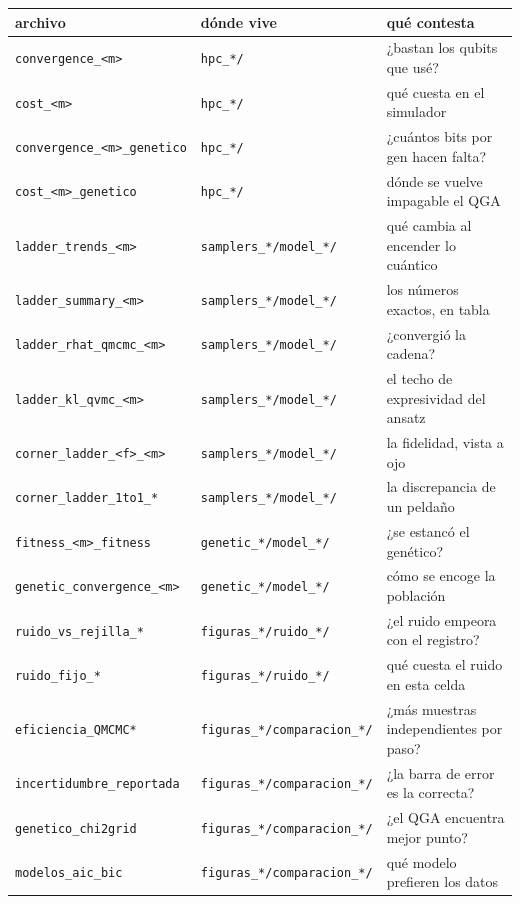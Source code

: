\documentclass[11pt,a4paper]{article}
\begin{document}
\small
\begin{longtable}{@{}>{\raggedright\arraybackslash}p{5.1cm}>{\raggedright\arraybackslash}p{4.3cm}>{\raggedright\arraybackslash}p{6.2cm}@{}}
\toprule
\textbf{archivo} & \textbf{dónde vive} & \textbf{qué contesta} \\
\midrule
\endhead
\texttt{convergence\_<m>} & \texttt{hpc\_*/}
  & ¿bastan los qubits que usé? \\
\texttt{cost\_<m>} & \texttt{hpc\_*/}
  & qué cuesta en el simulador \\
\texttt{convergence\_<m>\_genetico} & \texttt{hpc\_*/}
  & ¿cuántos bits por gen hacen falta? \\
\texttt{cost\_<m>\_genetico} & \texttt{hpc\_*/}
  & dónde se vuelve impagable el QGA \\
\addlinespace
\texttt{ladder\_trends\_<m>} & \texttt{samplers\_*/model\_*/}
  & qué cambia al encender lo cuántico \\
\texttt{ladder\_summary\_<m>} & \texttt{samplers\_*/model\_*/}
  & los números exactos, en tabla \\
\texttt{ladder\_rhat\_qmcmc\_<m>} & \texttt{samplers\_*/model\_*/}
  & ¿convergió la cadena? \\
\texttt{ladder\_kl\_qvmc\_<m>} & \texttt{samplers\_*/model\_*/}
  & el techo de expresividad del ansatz \\
\texttt{corner\_ladder\_<f>\_<m>} & \texttt{samplers\_*/model\_*/}
  & la fidelidad, vista a ojo \\
\texttt{corner\_ladder\_1to1\_*} & \texttt{samplers\_*/model\_*/}
  & la discrepancia de un peldaño \\
\addlinespace
\texttt{fitness\_<m>\_fitness} & \texttt{genetic\_*/model\_*/}
  & ¿se estancó el genético? \\
\texttt{genetic\_convergence\_<m>} & \texttt{genetic\_*/model\_*/}
  & cómo se encoge la población \\
\addlinespace
\texttt{ruido\_vs\_rejilla\_*} & \texttt{figuras\_*/ruido\_*/}
  & ¿el ruido empeora con el registro? \\
\texttt{ruido\_fijo\_*} & \texttt{figuras\_*/ruido\_*/}
  & qué cuesta el ruido en esta celda \\
\addlinespace
\texttt{eficiencia\_QMCMC*} & \texttt{figuras\_*/comparacion\_*/}
  & ¿más muestras independientes por paso? \\
\texttt{incertidumbre\_reportada} & \texttt{figuras\_*/comparacion\_*/}
  & ¿la barra de error es la correcta? \\
\texttt{genetico\_chi2grid} & \texttt{figuras\_*/comparacion\_*/}
  & ¿el QGA encuentra mejor punto? \\
\texttt{modelos\_aic\_bic} & \texttt{figuras\_*/comparacion\_*/}
  & qué modelo prefieren los datos \\
\bottomrule
\end{longtable}
\normalsize
\end{document}

